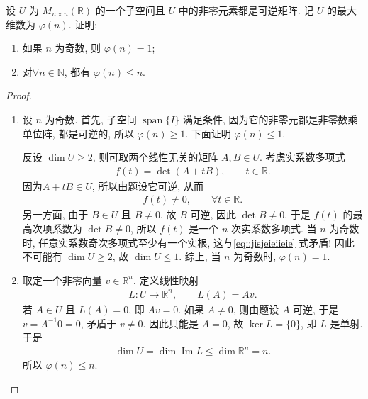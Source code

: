 \documentclass[../../main.tex]{subfiles}%
\begin{document}
\begin{example}
设 $U$ 为 $M_{n\times n}(\mathbb R)$ 的一个子空间且 $U$ 中的非零元素都是可逆矩阵. 记 $U$ 的最大维数为 $\varphi(n)$. 证明:
\begin{enumerate}[(1)]
\item 如果 $n$ 为奇数, 则 $\varphi(n)=1$;
\item 对$\forall n\in \mathbb{N}$, 都有 $\varphi(n)\leqslant n$.
\end{enumerate}
\end{example}
\begin{proof}
\begin{enumerate}[(1)]
\item 设 $n$ 为奇数. 首先, 子空间 $\operatorname{span}\{I\}$ 满足条件, 因为它的非零元都是非零数乘单位阵, 都是可逆的, 所以 $\varphi(n)\geqslant 1$. 下面证明 $\varphi(n)\leqslant 1$.

反设 $\dim U\geqslant 2$, 则可取两个线性无关的矩阵 $A,B\in U$. 考虑实系数多项式
\begin{align*}
f(t)=\det(A+tB),\qquad t\in\mathbb R.
\end{align*}
因为$A+tB\in U$, 所以由题设它可逆, 从而
\begin{align}\label{eq::jisjeieiieie}
f(t)\ne 0,\qquad \forall t\in\mathbb R.
\end{align}
另一方面, 由于 $B\in U$ 且 $B\ne 0$, 故 $B$ 可逆, 因此 $\det B\ne 0$. 于是 $f(t)$ 的最高次项系数为 $\det B\ne0$, 所以 $f(t)$ 是一个 $n$ 次实系数多项式. 当 $n$ 为奇数时, 任意实系数奇次多项式至少有一个实根, 这与\eqref{eq::jisjeieiieie}
式矛盾! 因此不可能有 $\dim U\geqslant 2$, 故 $\dim U\leqslant 1$.
综上, 当 $n$ 为奇数时, $\varphi(n)=1$.

\item 取定一个非零向量 $v\in\mathbb R^n$, 定义线性映射
\begin{align*}
L: U\to \mathbb R^n,\qquad L(A)=Av.
\end{align*}
若 $A\in U$ 且 $L(A)=0$, 即 $Av=0$. 如果 $A\ne 0$, 则由题设 $A$ 可逆, 于是 $v=A^{-1}0=0$, 矛盾于 $v\ne0$. 因此只能是 $A=0$, 故 $\ker L=\{0\}$, 即 $L$ 是单射. 于是
\begin{align*}
\dim U=\dim \operatorname{Im} L\leqslant \dim\mathbb R^n=n.
\end{align*}
所以 $\varphi(n)\leqslant n$.
\end{enumerate}
\end{proof}
\end{document}
